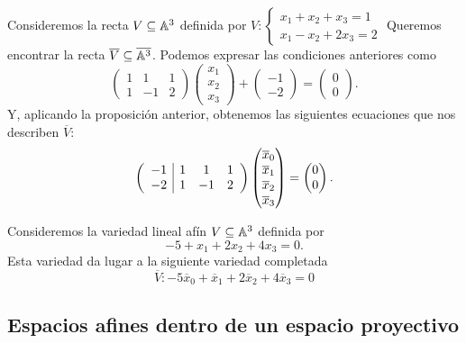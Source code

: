  \begin{example}
  Consideremos la recta $V \subseteq \mathbb{A}^3$ definida por $V:
  \begin{cases}
    x_1+x_2+x_3 = 1\\
    x_1-x_2+2x_3 = 2
  \end{cases}
  $
  Queremos encontrar la recta $\overline{V} \subseteq \overline{\mathbb{A}^3}$. Podemos
  expresar las condiciones anteriores como
  \[
    \begin{pmatrix}
      1 & 1 & 1 \\
      1 & -1 & 2 
    \end{pmatrix}
   \begin{pmatrix} x_1 \\ x_2 \\ x_3 \end{pmatrix} 
   + 
   \begin{pmatrix}
     -1 \\ -2
   \end{pmatrix}
   =
   \begin{pmatrix}
     0 \\ 0
   \end{pmatrix}.
 \]
Y, aplicando la proposición anterior, obtenemos las siguientes ecuaciones que nos
describen $\overline{V}$:
\[
  \left(
  \begin{array}{c|ccc}
      -1 & 1 & 1 & 1 \\
      -2 & 1 & -1 & 2 
    \end{array}
    \right)
    \begin{pmatrix} \overline{x}_0 \\ \overline{x}_1 \\ \overline{x}_2 \\ 
      \overline{x}_3 \end{pmatrix} 
   =
   \begin{pmatrix}
     0 \\ 0
   \end{pmatrix}.
 \]
 \end{example}
 \begin{example}
   Consideremos la variedad lineal afín $V \subseteq \mathbb{A}^3$ definida por
   \[-5 + x_1 + 2x_2 + 4x_3 = 0.\]
   Esta variedad da lugar a la siguiente variedad completada
   \[
     \overline{V}\colon -5\overline{x}_0 + \overline{x}_1 + 2\overline{x}_2 + 
   4\overline{x}_3=0
 \]
 \end{example}

 \subsection{Espacios afines dentro de un espacio proyectivo}

